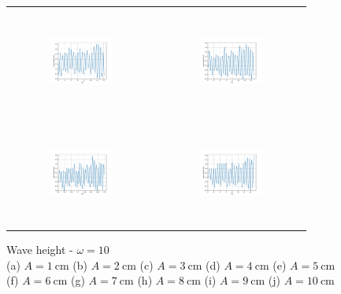\begin{figure}[H]
\begin{center}
\begin{tabular}{cc}
\includegraphics[width=0.45\textwidth, height=3.5cm]{graph/omega=3.00_A=7_wave.pdf}
&
\includegraphics[width=0.45\textwidth, height=3.5cm]{graph/omega=3.00_A=8_wave.pdf}\\
\includegraphics[width=0.45\textwidth, height=3.5cm]{graph/omega=3.00_A=9_wave.pdf}
&
\includegraphics[width=0.45\textwidth, height=3.5cm]{graph/omega=3.00_A=10_wave.pdf}\\
\end{tabular}
\end{center}
\caption{Wave height - $\omega=10$ \\ (a) $A=1\mathrm{~cm}$ (b) $A=2\mathrm{~cm}$ (c) $A=3\mathrm{~cm}$ (d) $A=4\mathrm{~cm}$ (e) $A=5\mathrm{~cm}$\\(f) $A=6\mathrm{~cm}$ (g) $A=7\mathrm{~cm}$ (h) $A=8\mathrm{~cm}$ (i) $A=9\mathrm{~cm}$ (j) $A=10\mathrm{~cm}$}
\label{Data_omega=10_wave}
\end{figure}

